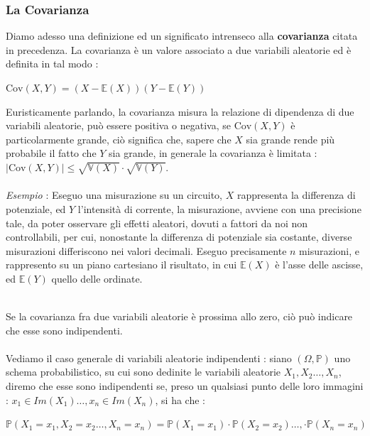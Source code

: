 \documentclass[12pt, letterpaper]{article}
\newcommand{\E}{{\mathbb E}}
\newcommand{\V}{{\mathbb V}}
\newcommand{\acc}{\\\hphantom{}\\}
\newcommand{\Prob}{{\mathbb P}}
\begin{document}
  \subsubsection{La Covarianza}
  Diamo adesso una definizione ed un significato intrenseco alla \textbf{covarianza}
citata in precedenza. La covarianza è un valore associato a due variabili 
aleatorie ed è definita in tal modo :\begin{center}
    \(
    \text{Cov}(X,Y)=(X-\E(X))(Y-\E(Y))    
    \)
\end{center}
Euristicamente parlando, la covarianza misura la relazione di dipendenza di 
due variabili aleatorie, può essere positiva o negativa, se 
\(\text{Cov}(X,Y)\) è particolarmente grande, ciò significa che, 
sapere che \(X\) sia grande rende più probabile il fatto che \(Y\) 
sia grande, in generale la covarianza è limitata : \(|\text{Cov}(X,Y)|\le\sqrt{\V(X)}\cdot\sqrt{\V(Y)}\).
\acc 
\textit{Esempio} : Eseguo una misurazione su un circuito, \(X\) rappresenta 
la differenza di potenziale, ed \(Y\) l'intensità di corrente, la misurazione, avviene 
con una precisione tale, da poter osservare gli effetti aleatori, dovuti a fattori 
da noi non controllabili, per cui, nonostante la differenza di potenziale sia costante, 
diverse misurazioni differiscono nei valori decimali. Eseguo precisamente 
\(n\) misurazioni, e rappresento su un piano cartesiano il risultato, 
in cui \(\E(X)\) è l'asse delle ascisse, ed \(\E(Y)\) quello 
delle ordinate.
\begin{figure}[h]
\end{figure}\\
Se la covarianza fra due variabili aleatorie è prossima allo zero, ciò può indicare che esse sono 
indipendenti.\acc 
Vediamo il caso generale di variabili aleatorie indipendenti : siano \((\Omega,\Prob)\) uno schema
probabilistico, su cui sono dedinite le variabili aleatorie \(X_1,X_2\dots,X_n\), diremo che esse 
sono indipendenti se, preso un qualsiasi punto delle loro immagini : 
\(x_1\in Im(X_1)\dots,x_n\in Im(X_n)\), si ha che :\begin{center}
    \(
        \Prob(X_1=x_1,X_2=x_2\dots,X_n=x_n)=\Prob(X_1=x_1)\cdot \Prob(X_2=x_2)\dots,\cdot\Prob(X_n=x_n)
    \)
\end{center}
\end{document}
